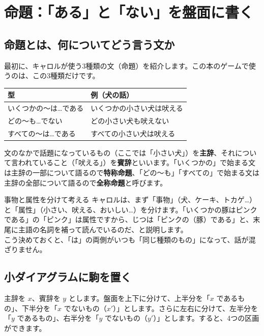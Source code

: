 \documentclass[a4paper,11pt,openany]{ltjsbook}
\begin{document}
\section{命題：「ある」と「ない」を盤面に書く}

\subsection{命題とは、何についてどう言う文か}

最初に、キャロルが使う3種類の文（命題）を紹介します。この本のゲームで使うのは、この3種類だけです。

\begin{center}
\begin{tabular}{ll}
\toprule
\textbf{型} & \textbf{例（犬の話）} \\
\midrule
いくつかの～は…である & いくつかの小さい犬は吠える \\
どの～も…でない & どの小さい犬も吠えない \\
すべての～は…である & すべての小さい犬は吠える \\
\bottomrule
\end{tabular}
\end{center}

文のなかで話題になっているもの（ここでは「小さい犬」）を\textbf{主辞}、それについて言われていること（「吠える」）を\textbf{賓辞}といいます。「いくつかの」で始まる文は主辞の一部について語るので\textbf{特称命題}、「どの～も」「すべての」で始まる文は主辞の全部について語るので\textbf{全称命題}と呼びます。

\begin{pointbox}{事物と属性を分けて考える}
キャロルは、まず「事物」（犬、ケーキ、トカゲ…）と「属性」（小さい、吠える、おいしい…）を分けます。「いくつかの豚はピンクである」の「ピンク」は属性ですから、じつは「ピンクの（豚）である」と、末尾に主語の名詞を補って読んでいるのだ、と説明します。\\
こう決めておくと、「は」の両側がいつも「同じ種類のもの」になって、話が混ざりません。
\end{pointbox}

\subsection{小ダイアグラムに駒を置く}

主辞を $x$、賓辞を $y$ とします。盤面を上下に分けて、上半分を「$x$ であるもの」、下半分を「$x$ でないもの（$x'$）」とします。さらに左右に分けて、左半分を「$y$ であるもの」、右半分を「$y$ でないもの（$y'$）」とします。すると、4つの区画ができます。
\end{document}
